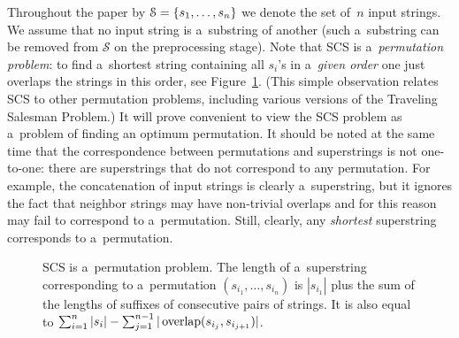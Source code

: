 Throughout the paper by ${\cal S}=\{s_1, \dots, s_n\}$ we denote
the set of~$n$ input strings. We assume that no input string is a~substring of another (such a~substring can be removed from $\mathcal{S}$ on the preprocessing stage). Note that SCS is a~{\em permutation problem}: to find a~shortest string containing all $s_i$'s in a~{\em given order} one just
overlaps the strings in this order, see Figure~\ref{fig:permutation}. (This simple observation relates SCS to other permutation problems, including various versions of the Traveling Salesman Problem.) It will prove convenient to view the SCS problem as a~problem of finding an optimum permutation.
It should be noted at the same time that the correspondence between permutations and superstrings is not one-to-one: there are superstrings that do not correspond to any permutation. For example, the concatenation of input strings is clearly a~superstring, but it ignores the fact that neighbor strings may have non-trivial overlaps and for this reason may fail to correspond to a~permutation. Still, clearly, any {\em shortest} superstring corresponds to a~permutation.


\begin{figure}[ht]
\caption{SCS is a~permutation problem. The length of a~superstring corresponding to a~permutation $(s_{i_1}, \dotsc, s_{i_n})$ is $|s_{i_1}|$ plus the sum of the lengths of suffixes of consecutive pairs of strings. It is also equal to $\sum_{i=1}^n |s_i|-\sum_{j=1}^{n-1}|\operatorname{overlap}(s_{i_j}, s_{i_{j+1}})|$.}
\label{fig:permutation}
\end{figure}


